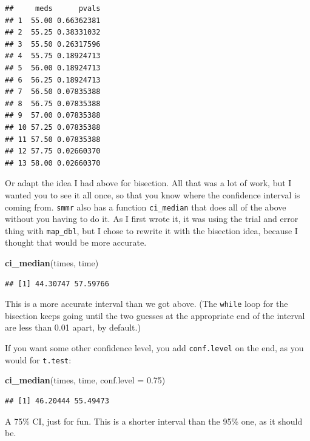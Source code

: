 \documentclass[]{tufte-book}
\newenvironment{Shaded}{}{}
\newcommand{\DataTypeTok}[1]{\textcolor[rgb]{0.56,0.13,0.00}{#1}}
\newcommand{\FloatTok}[1]{\textcolor[rgb]{0.25,0.63,0.44}{#1}}
\newcommand{\KeywordTok}[1]{\textcolor[rgb]{0.00,0.44,0.13}{\textbf{#1}}}
\newcommand{\NormalTok}[1]{#1}
\theoremstyle{definition}
\theoremstyle{definition}
\theoremstyle{definition}
\theoremstyle{remark}
\begin{document}
\begin{verbatim}
##     meds      pvals
## 1  55.00 0.66362381
## 2  55.25 0.38331032
## 3  55.50 0.26317596
## 4  55.75 0.18924713
## 5  56.00 0.18924713
## 6  56.25 0.18924713
## 7  56.50 0.07835388
## 8  56.75 0.07835388
## 9  57.00 0.07835388
## 10 57.25 0.07835388
## 11 57.50 0.07835388
## 12 57.75 0.02660370
## 13 58.00 0.02660370
\end{verbatim}

Or adapt the idea I had above for bisection. All that was a lot of work,
but I wanted you to see it all once, so that you know where the
confidence interval is coming from. \texttt{smmr} also has a function
\texttt{ci\_median} that does all of the above without you having to do
it. As I first wrote it, it was using the trial and error thing with
\texttt{map\_dbl}, but I chose to rewrite it with the bisection idea,
because I thought that would be more accurate.

\begin{Shaded}
\begin{Highlighting}[]
\KeywordTok{ci_median}\NormalTok{(times, time)}
\end{Highlighting}
\end{Shaded}

\begin{verbatim}
## [1] 44.30747 57.59766
\end{verbatim}

This is a more accurate interval than we got above. (The \texttt{while}
loop for the bisection keeps going until the two guesses at the
appropriate end of the interval are less than 0.01 apart, by default.)

If you want some other confidence level, you add \texttt{conf.level} on
the end, as you would for \texttt{t.test}:

\begin{Shaded}
\begin{Highlighting}[]
\KeywordTok{ci_median}\NormalTok{(times, time, }\DataTypeTok{conf.level =} \FloatTok{0.75}\NormalTok{)}
\end{Highlighting}
\end{Shaded}

\begin{verbatim}
## [1] 46.20444 55.49473
\end{verbatim}

A 75\% CI, just for fun. This is a shorter interval than the 95\% one,
as it should be.
\end{document}
